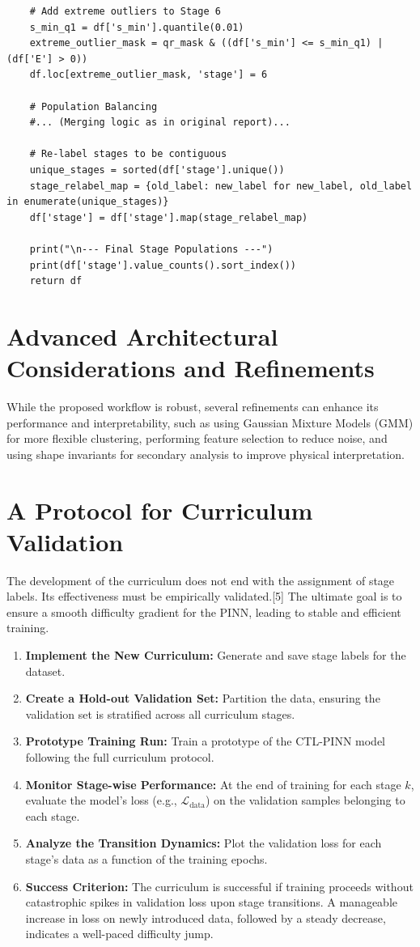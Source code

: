 \begin{lstlisting}
    # Add extreme outliers to Stage 6
    s_min_q1 = df['s_min'].quantile(0.01)
    extreme_outlier_mask = qr_mask & ((df['s_min'] <= s_min_q1) | (df['E'] > 0))
    df.loc[extreme_outlier_mask, 'stage'] = 6

    # Population Balancing
    #... (Merging logic as in original report)...

    # Re-label stages to be contiguous
    unique_stages = sorted(df['stage'].unique())
    stage_relabel_map = {old_label: new_label for new_label, old_label in enumerate(unique_stages)}
    df['stage'] = df['stage'].map(stage_relabel_map)

    print("\n--- Final Stage Populations ---")
    print(df['stage'].value_counts().sort_index())
    return df
\end{lstlisting}

\section{Advanced Architectural Considerations and Refinements}

While the proposed workflow is robust, several refinements can enhance its performance and interpretability, such as using Gaussian Mixture Models (GMM) for more flexible clustering, performing feature selection to reduce noise, and using shape invariants for secondary analysis to improve physical interpretation.

\section{A Protocol for Curriculum Validation}

The development of the curriculum does not end with the assignment of stage labels. Its effectiveness must be empirically validated.[5] The ultimate goal is to ensure a smooth difficulty gradient for the PINN, leading to stable and efficient training.
\begin{enumerate}
    \item \textbf{Implement the New Curriculum:} Generate and save stage labels for the dataset.
    \item \textbf{Create a Hold-out Validation Set:} Partition the data, ensuring the validation set is stratified across all curriculum stages.
    \item \textbf{Prototype Training Run:} Train a prototype of the CTL-PINN model following the full curriculum protocol.
    \item \textbf{Monitor Stage-wise Performance:} At the end of training for each stage $k$, evaluate the model's loss (e.g., $\mathcal{L}_{\text{data}}$) on the validation samples belonging to each stage.
    \item \textbf{Analyze the Transition Dynamics:} Plot the validation loss for each stage's data as a function of the training epochs.
    \item \textbf{Success Criterion:} The curriculum is successful if training proceeds without catastrophic spikes in validation loss upon stage transitions. A manageable increase in loss on newly introduced data, followed by a steady decrease, indicates a well-paced difficulty jump.
\end{enumerate}
